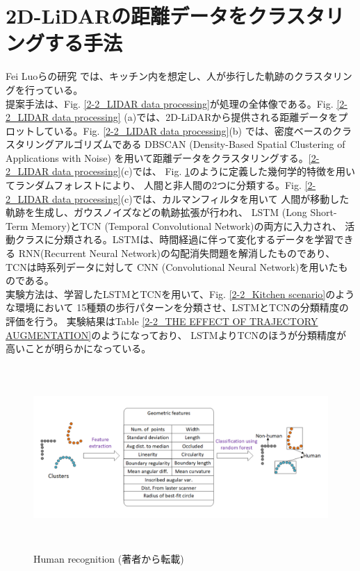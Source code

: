 \section{2D-LiDARの距離データをクラスタリングする手法}
Fei Luoらの研究\cite{Temporal convolutional networks for multi-person activity recognition using a 2D LIDAR}
では、キッチン内を想定し、人が歩行した軌跡のクラスタリングを行っている。\\ \indent
提案手法は、Fig. \ref{2-2_LIDAR data processing}が処理の全体像である。Fig. \ref{2-2_LIDAR data processing}
(a)では、2D-LiDARから提供される距離データをプロットしている。Fig. \ref{2-2_LIDAR data processing}(b)
では、密度ベースのクラスタリングアルゴリズムである
DBSCAN (Density-Based Spatial Clustering of Applications with Noise)
を用いて距離データをクラスタリングする。\ref{2-2_LIDAR data processing}(c)では、
Fig. \ref{2-2_Human recognition}のように定義した幾何学的特徴を用いてランダムフォレストにより、
人間と非人間の2つに分類する。Fig. \ref{2-2_LIDAR data processing}(c)では、カルマンフィルタを用いて
人間が移動した軌跡を生成し、ガウスノイズなどの軌跡拡張が行われ、
LSTM (Long Short-Term Memory)とTCN (Temporal Convolutional Network)の両方に入力され、
活動クラスに分類される。LSTMは、時間経過に伴って変化するデータを学習できる
RNN(Recurrent Neural Network)の勾配消失問題を解消したものであり、TCNは時系列データに対して
CNN (Convolutional Neural Network)を用いたものである。\\ \indent
実験方法は、学習したLSTMとTCNを用いて、Fig. \ref{2-2_Kitchen scenario}のような環境において
15種類の歩行パターンを分類させ、LSTMとTCNの分類精度の評価を行う。
実験結果はTable \ref{2-2_THE EFFECT OF TRAJECTORY AUGMENTATION}のようになっており、
LSTMよりTCNのほうが分類精度が高いことが明らかになっている。

\begin{figure}[h]
  \begin{center}
  \includegraphics[height=70mm,clip]{figure/2-2_Human-recognition.png}
  \caption{Human recognition (著者\cite{Temporal convolutional networks for multi-person activity recognition using a 2D LIDAR}から転載)}
  \label{2-2_Human recognition}
  \end{center}
\end{figure}

